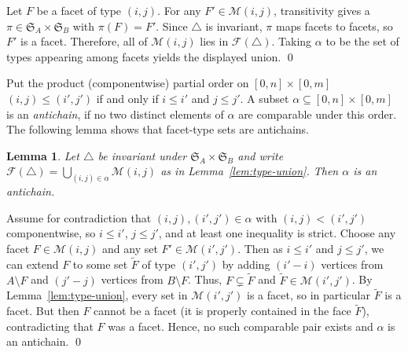 \documentclass[12pt]{article}
\renewenvironment{proof}{{\noindent\bfseries Proof.}}{\qed}
\theoremstyle{plain}
\newtheorem{lemma}[theorem]{Lemma}
\theoremstyle{definition}
\begin{document}
	\begin{proof}
		Let $F$ be a facet of type $(i,j)$. For any $F'\in \mathcal{M}(i,j)$, transitivity gives a
		$\pi\in\mathfrak{S}_A\times\mathfrak{S}_B$ with $\pi(F)=F'$. Since $\bigtriangleup$ is invariant,
		$\pi$ maps facets to facets, so $F'$ is a facet. Therefore, all of $\mathcal{M}(i,j)$ lies in
		$\mathcal{F}(\bigtriangleup)$. Taking $\alpha$ to be the set of types appearing among facets yields the
		displayed union.
	\end{proof}
	
	\medskip
	Put the product (componentwise) partial order on $[0,n]\times[0,m]$
	 $(i,j)\le (i',j')$ if and only if $i\le i'$ and $j\le j'.$ 
	A subset $\alpha\subseteq[0,n]\times[0,m]$ is an \emph{antichain}, if no two distinct elements of $\alpha$
	are comparable under this order. The following lemma shows that facet-type sets are antichains.
	
	\begin{lemma}\label{lem:alpha-antichain}
		Let $\bigtriangleup$ be invariant under $\mathfrak{S}_A\times\mathfrak{S}_B$ and write
		$\mathcal{F}(\bigtriangleup)=\bigcup_{(i,j)\in\alpha}\mathcal{M}(i,j)$ as in Lemma~\ref{lem:type-union}.
		Then $\alpha$ is an antichain.
	\end{lemma}
	
	\begin{proof}
		Assume for contradiction that $(i,j),(i',j')\in\alpha$ with $(i,j)<(i',j')$ componentwise, so
		$i\le i'$, $j\le j'$, and at least one inequality is strict. Choose any facet $F\in\mathcal{M}(i,j)$ and any set $F'\in\mathcal{M}(i',j')$. Then as $i\le i'$ and $j\le j'$, we can extend $F$ to some set $\widetilde{F}$ of type $(i',j')$
		by adding $(i'-i)$ vertices from $A\setminus F$ and $(j'-j)$ vertices from $B\setminus F$.
		Thus, $F\subsetneq \widetilde{F}$ and $\widetilde{F}\in\mathcal{M}(i',j')$. By Lemma~\ref{lem:type-union}, every set in $\mathcal{M}(i',j')$ is a facet, so in particular
		$\widetilde{F}$ is a facet. But then $F$ cannot be a facet (it is properly contained in the face
		$\widetilde{F}$), contradicting that $F$ was a facet. Hence, no such comparable pair exists and
		$\alpha$ is an antichain.
	\end{proof}
	
\end{document}
